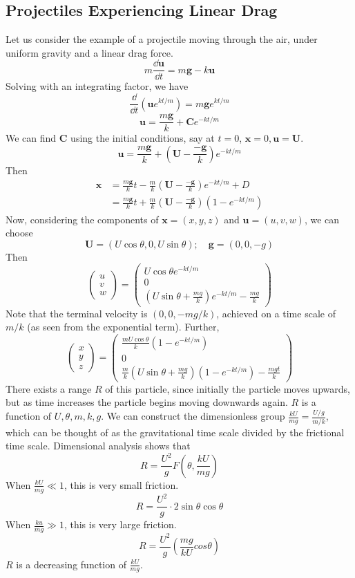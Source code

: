 \documentclass{article}
\begin{document}
\subsection{Projectiles Experiencing Linear Drag}
Let us consider the example of a projectile moving through the air, under uniform gravity and a linear drag force.
\[ m \frac{\dd \bm u}{\dd t} = m\bm g - k\bm u \]
Solving with an integrating factor, we have
\[ \frac{\dd}{\dd t}\left( \bm u e^{kt/m} \right) = m\bm g e^{kt/m} \]
\[ \bm u = \frac{m\bm g}{k} + \bm C e^{-kt/m} \]
We can find $\bm C$ using the initial conditions, say at $t=0$, $\bm x = 0, \bm u = \bm U$.
\[ \bm u = \frac{m\bm g}{k} + \left( \bm U - \frac{-\bm g}{k} \right) e^{-kt/m} \]
Then
\begin{align*}
    \bm x & = \frac{m\bm g}{k}t - \frac{m}{k}\left( \bm U - \frac{-\bm g}{k} \right) e^{-kt/m} + D               \\
          & =\frac{m\bm g}{k}t + \frac{m}{k}\left( \bm U - \frac{-\bm g}{k} \right) \left( 1 - e^{-kt/m} \right)
\end{align*}
Now, considering the components of $\bm x = (x, y, z)$ and $\bm u = (u, v, w)$, we can choose
\[ \bm U = (U \cos \theta, 0, U\sin\theta);\quad \bm g = (0, 0, -g) \]
Then
\[ \begin{pmatrix}
        u \\ v \\ w
    \end{pmatrix} = \begin{pmatrix}
        U\cos\theta e^{-kt/m} \\
        0                     \\
        \left(U \sin\theta + \frac{mg}{k}\right)e^{-kt/m} - \frac{mg}{k}
    \end{pmatrix} \]
Note that the terminal velocity is $(0, 0, -mg/k)$, achieved on a time scale of $m/k$ (as seen from the exponential term). Further,
\[ \begin{pmatrix}
        x \\ y \\ z
    \end{pmatrix} = \begin{pmatrix}
        \frac{mU\cos\theta}{k}\left( 1 - e^{-kt/m} \right) \\
        0                                                  \\
        \frac{m}{k}\left( U \sin\theta + \frac{mg}{k} \right)\left( 1 - e^{-kt/m} \right) - \frac{mgt}{k}
    \end{pmatrix} \]
There exists a range $R$ of this particle, since initially the particle moves upwards, but as time increases the particle begins moving downwards again. $R$ is a function of $U, \theta, m, k, g$. We can construct the dimensionless group $\frac{kU}{mg} = \frac{U/g}{m/k}$, which can be thought of as the gravitational time scale divided by the frictional time scale. Dimensional analysis shows that
\[ R = \frac{U^2}{g}F\left(\theta, \frac{kU}{mg}\right) \]
When $\frac{kU}{mg} \ll 1$, this is very small friction.
\[ R = \frac{U^2}{g}\cdot 2\sin\theta\cos\theta \]
When $\frac{ku}{mg} \gg 1$, this is very large friction.
\[ R = \frac{U^2}{g} \left( \frac{mg}{kU}cos\theta \right) \]
$R$ is a decreasing function of $\frac{kU}{mg}$.
\end{document}
